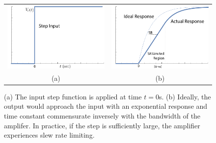 \begin{figure}[tb]
\begin{center}
\begin{tabular}{cc}
\includegraphics[width=.5\columnwidth]{step_input} &
\includegraphics[width=.5\columnwidth]{exp_slew} \\
(a) & (b) \\
\end{tabular}
\end{center}
\caption{(a) The input step function is applied at time $t=0$s.  (b) Ideally, the output would approach the input with an exponential response and time constant commensurate inversely with the bandwidth of the amplifer. In practice, if the step is sufficiently large, the amplifier experiences slew rate limiting.}
\label{fig:step_input}
\end{figure}

